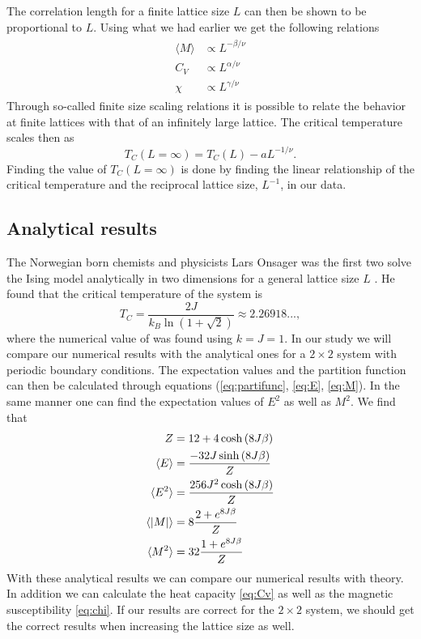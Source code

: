 \documentclass[%
 reprint,
nofootinbib,
aps,
]{revtex4-1}
\begin{document}
The correlation length for a finite lattice size $L$ can then be shown to be proportional to $L$. Using what we had earlier we get the following relations
\begin{align}
    \begin{split}
        \langle M \rangle &\propto L^{-\beta/\nu} \\
        C_V &\propto L^{\alpha/\nu} \\
        \chi &\propto L^{\gamma/\nu}
    \end{split}
\end{align}
Through so-called finite size scaling relations it is possible to relate the behavior at finite lattices with that of an infinitely large lattice. The critical temperature scales then as
\begin{equation}
  T_C(L=\infty) = T_C(L)-aL^{-1/\nu} \label{eq:noe}.
\end{equation}
Finding the value of $T_C(L=\infty)$ is done by finding the linear relationship of the critical temperature and the reciprocal lattice size, $L^{-1}$, in our data.
\subsection{Analytical results}\label{sec:analytic}
The Norwegian born chemists and physicists Lars Onsager was the first two solve the Ising model analytically in two dimensions for a general lattice size $L$ \cite{onsager}. He found that the critical temperature of the system is
\begin{equation}
  T_C = \frac{2J}{k_B\ln{\left(1+\sqrt{2}\right)}} \approx 2.26918..., \label{eq:Tc}
\end{equation}
where the numerical value of was found using $k=J=1$.
In our study we will compare our numerical results with the analytical ones for a $2\times 2$ system with periodic boundary conditions. The expectation values and the partition function can then be calculated through equations (\ref{eq:partifunc}, \ref{eq:E}, \ref{eq:M}). In the same manner one can find the expectation values of $E^2$ as well as $M^2$. We find that
\begin{align}
  Z &= 12 + 4\cosh{\left(8J\beta\right)} \\
  \langle E \rangle &= \frac{-32J\sinh{\left( 8J\beta \right)}}{Z}\\
  \langle E^2 \rangle &= \frac{256J^2\cosh{\left( 8J\beta \right)}}{Z}\\
  \langle \abs{M} \rangle &= 8\frac{2+e^{8J\beta}}{Z} \\
  \langle M^2 \rangle &= 32\frac{1+e^{8J\beta}}{Z}
\end{align}
With these analytical results we can compare our numerical results with theory. In addition we can calculate the heat capacity \eqref{eq:Cv} as well as the magnetic susceptibility \eqref{eq:chi}. If our results are correct for the $2\times 2$ system, we should get the correct results when increasing the lattice size as well.\\
\end{document}
